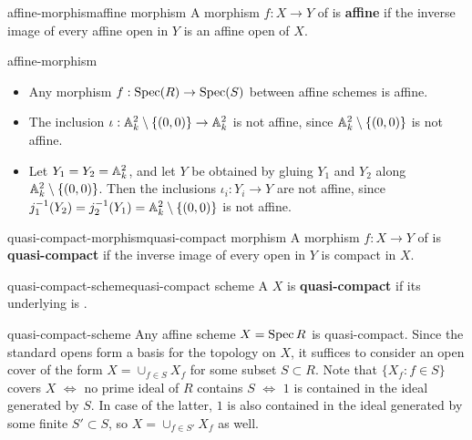 \begin{topic}{affine-morphism}{affine morphism}
    A morphism $f : X \to Y$ of  is \textbf{affine} if the inverse image of every affine open in $Y$ is an affine open of $X$. 
\end{topic}

\begin{example}{affine-morphism}
    \begin{itemize}
        \item Any morphism $f : \Spec(R) \to \Spec(S)$ between affine schemes is affine.
        \item The inclusion $\iota : \AA^2_k \setminus \{ (0, 0) \} \to \AA^2_k$ is not affine, since $\AA^2_k \setminus \{ (0, 0) \}$ is not affine.
        \item Let $Y_1 = Y_2 = \AA^2_k$, and let $Y$ be obtained by gluing $Y_1$ and $Y_2$ along $\AA^2_k \setminus \{ (0, 0) \}$. Then the inclusions $\iota_i : Y_i \to Y$ are not affine, since $j_1^{-1}(Y_2) = j_2^{-1}(Y_1) = \AA^2_k \setminus \{ (0, 0) \}$ is not affine.
    \end{itemize}
\end{example}

\begin{topic}{quasi-compact-morphism}{quasi-compact morphism}
    A morphism $f : X \to Y$ of  is \textbf{quasi-compact} if the inverse image of every  open in $Y$ is compact in $X$.
\end{topic}

\begin{topic}{quasi-compact-scheme}{quasi-compact scheme}
    A  $X$ is \textbf{quasi-compact} if its underlying  is .
\end{topic}

\begin{example}{quasi-compact-scheme}
    Any affine scheme $X = \Spec R$ is quasi-compact. Since the standard opens form a basis for the topology on $X$, it suffices to consider an open cover of the form $X = \cup_{f \in S} X_f$ for some subset $S \subset R$. Note that $\{ X_f : f \in S \}$ covers $X$ $\iff$ no prime ideal of $R$ contains $S$ $\iff$ $1$ is contained in the ideal generated by $S$. In case of the latter, $1$ is also contained in the ideal generated by some finite $S' \subset S$, so $X = \cup_{f \in S'} X_f$ as well.
\end{example}

